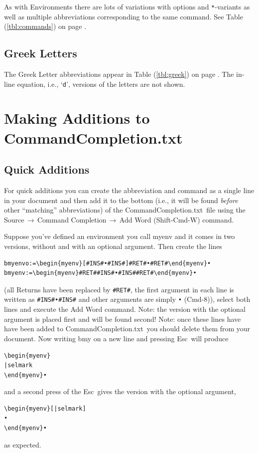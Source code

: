 \documentclass[11pt]{article}
\newcommand{\esckey}{\textsf{Esc}}
\newcommand{\mnu}[1]{\textsf{#1}}
\newcommand{\cmd}[1]{\textsf{#1}}
\newcommand{\To}{\,\(\to\)\,}
\newcommand{\CCT}{\textsf{CommandCompletion.txt}}
\begin{document}
As with Environments there are lots of variations with options and \texttt{*}-variants as well as multiple abbreviations corresponding to the same command. See Table (\ref{tbl:commands}) on page \pageref{tbl:commands}.

\subsection*{Greek Letters}

The Greek Letter abbreviations appear in Table (\ref{tbl:greek}) on page \pageref{tbl:greek}. The in-line equation, i.e., `\texttt{d}', versions of the letters are not shown.

\section*{Making Additions to \CCT}

\subsection*{Quick Additions}

For quick additions you can create the abbreviation and command as a single line in your document and then add it to the bottom (i.e., it will be found \emph{before} other ``matching'' abbreviations) of the \CCT\ file using the \mnu{Source}\To\mnu{Command Completion}\To\mnu{Add Word} (\cmd{Shift-Cmd-W}) command.

Suppose you've defined an environment you call \cmd{myenv} and it comes in two versions, without and with an optional argument. Then create the lines
\begin{verbatim}
bmyenvo:=\begin{myenv}[#INS#•#INS#]#RET#•#RET#\end{myenv}•
bmyenv:=\begin{myenv}#RET##INS#•#INS##RET#\end{myenv}•
\end{verbatim}
(all \cmd{Returns} have been replaced by \verb|#RET#|, the first argument in each line is written as \verb|#INS#•#INS#| and other arguments are simply \verb|•| (\cmd{Cmd-8})), select both lines and execute the \mnu{Add Word} command. Note: the version with the optional argument is placed first and will be found second!  Note: once these lines have have been added to \CCT\ you should delete them from your document. Now writing \cmd{bmy} on a new line and pressing \esckey\ will produce
\begin{verbatim}
\begin{myenv}
|selmark
\end{myenv}•
\end{verbatim}
and a second press of the \esckey\ gives the version with the optional argument,
\begin{verbatim}
\begin{myenv}[|selmark]
•
\end{myenv}•
\end{verbatim}
as expected.
\end{document}
